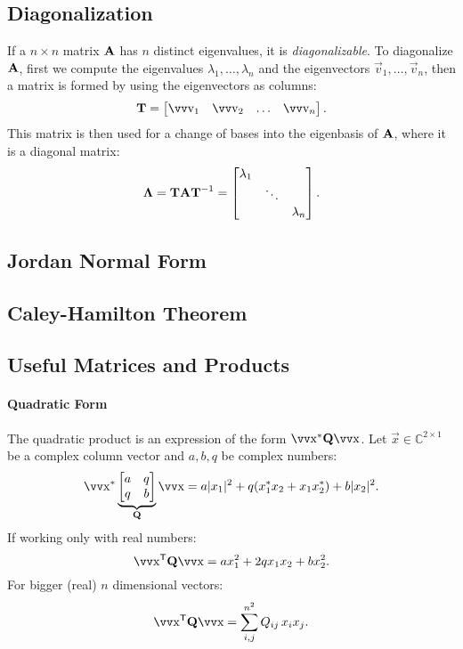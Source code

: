 \subsection{Diagonalization}

If a \(n \times n\) matrix \(\bm{\mathrm{A}}\) has \(n\) distinct eigenvalues, it is \emph{diagonalizable}. To diagonalize \(\bm{\mathrm{A}}\), first we compute the eigenvalues \(\lambda_1, \ldots, \lambda_n\) and the eigenvectors \(\vec{v}_1, \ldots, \vec{v}_n\), then a matrix is formed by using the eigenvectors as columns:
\[
	\mx{T} = \begin{bmatrix}
		\vec{v}_1 & \vec{v}_2 & \dots & \vec{v}_n
	\end{bmatrix}.
\]
This matrix is then used for a change of bases into the eigenbasis of \(\bm{\mathrm{A}}\), where it is a diagonal matrix:
\[
	\bm{\mathrm{\Lambda}} = \bm{\mathrm{T}} \bm{\mathrm{A}} \bm{\mathrm{T}}^{-1} = \begin{bmatrix}
		\lambda_1 \\
		& \ddots \\
		& & \lambda_n
	\end{bmatrix}.
\]

\subsection{Jordan Normal Form}


\subsection{Caley-Hamilton Theorem}


\subsection{Useful Matrices and Products}

\paragraph{Quadratic Form}

The quadratic product is an expression of the form \(\vec{x}^* \mx{Q} \vec{x}\). Let \(\vec{x} \in \mathbb{C}^{2\times 1}\) be a complex column vector and \(a, b, q\) be complex numbers:
\[
	\vec{x}^*
	\underbrace{
		\begin{bmatrix}
			a & q \\ q & b
		\end{bmatrix}
	}_{\mx{Q}}
	\vec{x}
	=
	a |x_1|^2 + q(x_1^* x_2 + x_1 x_2^*) + b |x_2|^2.
\]
If working only with real numbers:
\[
	\vec{x}^\mathsf{T} \mx{Q} \vec{x} = a x_1^2 + 2q x_1 x_2 + b x_2^2.
\]
For bigger (real) \(n\) dimensional vectors:
\[
	\vec{x}^\mathsf{T} \mx{Q} \vec{x} = \sum_{i,j}^{n^2} Q_{ij} \, x_i x_j.
\]

